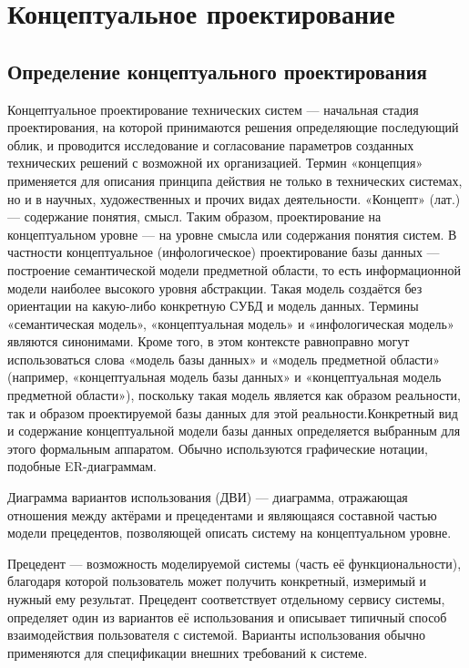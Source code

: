 \documentclass[14pt,a4paper,russian]{extreport}
\begin{document}
\chapter{Концептуальное проектирование}
\section{Определение концептуального проектирования}
Концептуальное проектирование технических систем — начальная стадия проектирования, на которой
принимаются решения определяющие последующий облик, и проводится исследование и согласование
параметров созданных технических решений с возможной их организацией. Термин «концепция»
применяется для описания принципа действия не только в технических системах, но и в научных,
художественных и прочих видах деятельности. «Концепт» (лат.) — содержание понятия, смысл. Таким
образом, проектирование на концептуальном уровне — на уровне смысла или содержания понятия систем.
В частности концептуальное (инфологическое) проектирование базы данных — построение семантической модели
предметной области, то есть информационной модели наиболее высокого уровня абстракции. Такая модель
создаётся без ориентации на какую-либо конкретную СУБД и модель данных. Термины «семантическая
модель», «концептуальная модель» и «инфологическая модель» являются синонимами. Кроме того,
в этом контексте равноправно могут использоваться слова «модель базы данных» и «модель
предметной области» (например, «концептуальная модель базы данных» и «концептуальная модель
предметной области»), поскольку такая модель является как образом реальности, так и
образом проектируемой базы данных для этой реальности.Конкретный вид и содержание концептуальной
модели базы данных определяется выбранным для этого формальным аппаратом. Обычно используются
графические нотации, подобные ER-диаграммам.
\par
Диаграмма вариантов использования (ДВИ) — диаграмма, отражающая
отношения между актёрами и прецедентами и являющаяся составной частью модели прецедентов,
позволяющей описать систему на концептуальном уровне.

Прецедент — возможность моделируемой системы (часть её функциональности), благодаря которой
пользователь может получить конкретный, измеримый и нужный ему результат. Прецедент соответствует
отдельному сервису системы, определяет один из вариантов её использования и описывает типичный
способ взаимодействия пользователя с системой. Варианты использования обычно применяются для
спецификации внешних требований к системе.  \cite{dbdesign}
\end{document}

